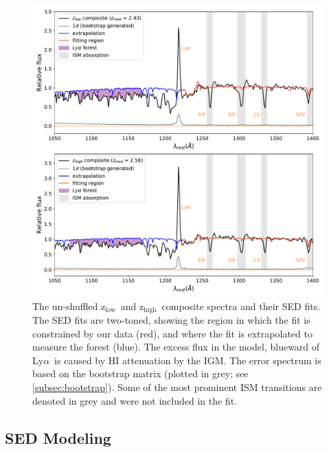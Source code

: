 \documentclass[twocolumn,tight,times]{aastex63}
\newcommand{\lya}{Ly$\alpha$}
\newcommand{\hiz}{$\mathrm{z_{high}}$}
\newcommand{\loz}{$\mathrm{z_{low}}$}
\begin{document}
\begin{figure}[ht]
    \centering
    \includegraphics[scale = .5]{composite_models.pdf}
    \caption{The un-shuffled \loz\ and \hiz\ composite spectra and their SED fits. The SED fits are two-toned, showing the region in which the fit is constrained by our data (red), and where the fit is extrapolated to measure the forest (blue). The excess flux in the model, blueward of \lya\ is caused by HI attenuation by the IGM. The error spectrum is based on the bootstrap matrix (plotted in grey; see \ref{subsec:bootstrap}). Some of the most prominent ISM transitions are denoted in grey and were not included in the fit.}
    \label{fig:model}
\end{figure}

\subsection{SED Modeling}
\label{subsec:models}
\end{document}
